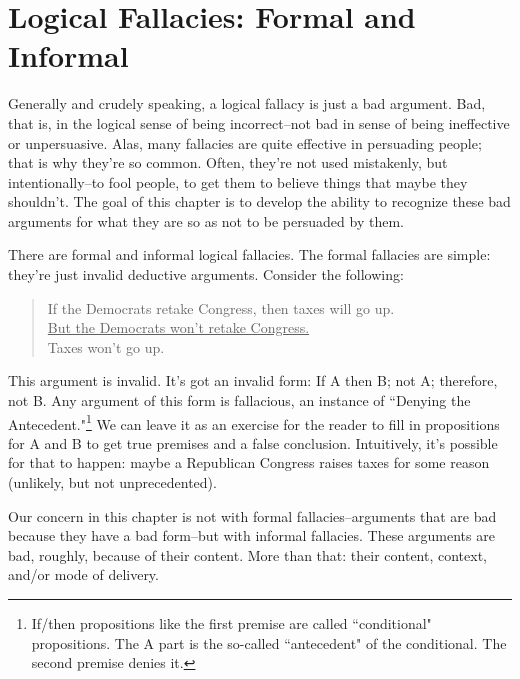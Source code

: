 
\chapter{Logical Fallacies: Formal and Informal}
Generally and crudely speaking, a logical fallacy is just a bad argument. Bad, that is, in the logical
sense of being incorrect--not bad in sense of being ineffective or unpersuasive. Alas, many
fallacies are quite effective in persuading people; that is why they're so common. Often, they're
not used mistakenly, but intentionally--to fool people, to get them to believe things that maybe
they shouldn't. The goal of this chapter is to develop the ability to recognize these bad arguments
for what they are so as not to be persuaded by them.

There are formal and informal logical fallacies. The formal fallacies are simple: they're just invalid
deductive arguments. Consider the following:

\begin{quote}
If the Democrats retake Congress, then taxes will go up. \\
\underline{But the Democrats won't retake Congress.} \\
Taxes won't go up.
\end{quote}

This argument is invalid. It's got an invalid form: If A then B; not A; therefore, not B. Any
argument of this form is fallacious, an instance of ``Denying the 
Antecedent."\footnote{If/then propositions like the first premise are called ``conditional" 
propositions. The A part is the so-called
``antecedent" of the conditional. The second premise denies it.} 
We can leave it as
an exercise for the reader to fill in propositions for A and B to get true premises and a false
conclusion. Intuitively, it's possible for that to happen: maybe a Republican Congress raises taxes
for some reason (unlikely, but not unprecedented).

Our concern in this chapter is not with formal fallacies--arguments that are bad because they have
a bad form--but with informal fallacies. These arguments are bad, roughly, because of their
content. More than that: their content, context, and/or mode of delivery.

